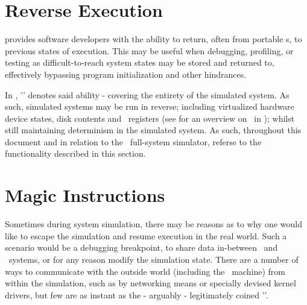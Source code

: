 \section*{Reverse Execution}
\label{sec:background_reverseexecution}

 provides software developers with the ability to return, often from portable \dvttermcheckpoint s, to previous states of execution.
This may be useful when debugging, profiling, or testing as difficult-to-reach system states may be stored and returned to, effectively bypassing program initialization and other hindrances.

In \dvttermsimics , '\dvttermreverseexecution ' denotes said ability - covering the entirety of the simulated system.
As such, simulated systems may be run in reverse; including virtualized hardware device states, disk contents and \dvttermcpu\ registers (see  for an overview on \dvttermreverseexecution\ in \dvttermsimics ); whilst still maintaining determinism in the simulated system.
As such, throughout this document and in relation to the \dvttermsimics\ full-system simulator, \dvttermreverseexecution referse to the functionality described in this section.

\section*{Magic Instructions}
\label{sec:background_magicinstructions}
Sometimes during system simulation, there may be reasons as to why one would like to escape the simulation and resume execution in the real world.
Such a scenario would be a debugging breakpoint, to share data in-between \dvttermtarget\ and \dvttermhost\ systems, or for any reason modify the simulation state.
There are a number of ways to communicate with the outside world (including the \dvttermhost\ machine) from within the simulation, such as by networking means or specially devised kernel drivers, but few are as instant as the - arguably - legitimately coined '\dvttermmagicinstruction '.

